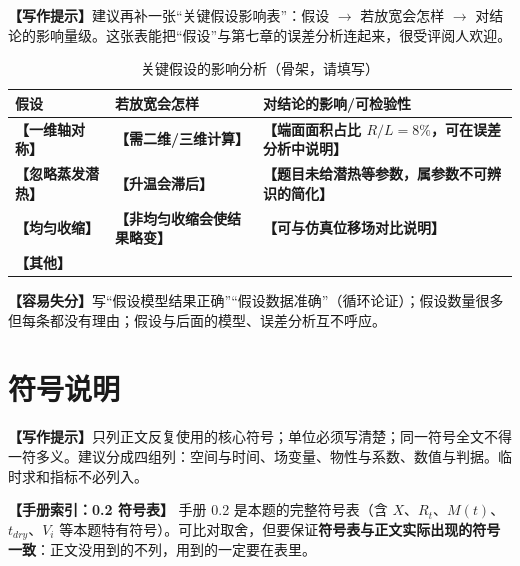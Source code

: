 \documentclass[12pt,a4paper]{article}
\newcommand{\prompt}[1]{\par\noindent\textbf{【写作提示】}#1\par}      %
\newcommand{\pitfall}[1]{\par\noindent\textbf{【容易失分】}#1\par}     %
\newcommand{\ph}[1]{\textbf{【#1】}}                                   %
\newcommand{\handbook}[2]{\par\noindent\textbf{【手册索引：#1】} #2\par}
\begin{document}
\prompt{建议再补一张“关键假设影响表”：假设 $\rightarrow$ 若放宽会怎样 $\rightarrow$ 对结论的影响量级。这张表能把“假设”与第七章的误差分析连起来，很受评阅人欢迎。}

\begin{table}[H]
\centering
\caption{关键假设的影响分析（骨架，请填写）}
\label{tab:assumption-check}
\begin{tabular}{p{3.2cm}p{5.2cm}p{6.2cm}}
\toprule
假设 & 若放宽会怎样 & 对结论的影响/可检验性\\
\midrule
\ph{一维轴对称} & \ph{需二维/三维计算} & \ph{端面面积占比 $R/L=8\%$，可在误差分析中说明}\\
\ph{忽略蒸发潜热} & \ph{升温会滞后} & \ph{题目未给潜热等参数，属参数不可辨识的简化}\\
\ph{均匀收缩} & \ph{非均匀收缩会使结果略变} & \ph{可与仿真位移场对比说明}\\
\ph{其他} & & \\
\bottomrule
\end{tabular}
\end{table}

\pitfall{写“假设模型结果正确”“假设数据准确”（循环论证）；假设数量很多但每条都没有理由；假设与后面的模型、误差分析互不呼应。}

\clearpage

\section{符号说明}

\prompt{只列正文反复使用的核心符号；单位必须写清楚；同一符号全文不得一符多义。建议分成四组列：空间与时间、场变量、物性与系数、数值与判据。临时求和指标不必列入。}

\handbook{0.2 符号表}{手册 0.2 是本题的完整符号表（含 $X$、$R_t$、$M(t)$、$t_{dry}$、$V_i$ 等本题特有符号）。可比对取舍，但要保证\textbf{符号表与正文实际出现的符号一致}：正文没用到的不列，用到的一定要在表里。}
\end{document}
